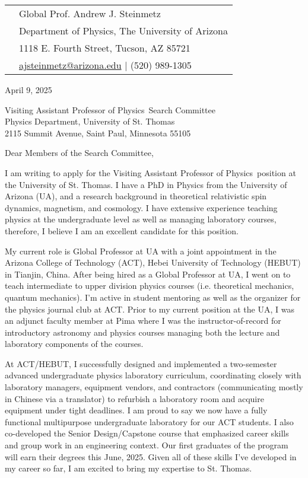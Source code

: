 \documentclass[11pt]{article}
\newcommand*{\PositionName}{Visiting Assistant Professor of Physics}
\newcommand*{\DepartmentName}{Physics Department}
\newcommand*{\FullName}{University of St. Thomas}
\newcommand*{\ShortName}{St. Thomas}
\newcommand*{\StreetAddress}{2115 Summit Avenue}
\newcommand*{\CityState}{Saint Paul, Minnesota 55105}
\begin{document}

\noindent
\begin{tabular}{@{}p{7.0cm} p{9.0cm}@{}}
    & Global Prof. Andrew J. Steinmetz\\
    & Department of Physics, The University of Arizona\\
    & 1118 E. Fourth Street, Tucson, AZ 85721\\
    & \href{mailto:ajsteinmetz@arizona.edu}{ajsteinmetz@arizona.edu} \(\vert\) (520) 989-1305
\end{tabular}

\vspace{1em}

\noindent
April 9, 2025

\vspace{1em}

\noindent
\PositionName\ Search Committee\\
\DepartmentName, \FullName\\
\StreetAddress, \CityState

\vspace{2em}


\noindent
Dear Members of the Search Committee,

\noindent
I am writing to apply for the \PositionName\ position at the \FullName. I have a PhD in Physics from the University of Arizona (UA), and a research background in theoretical relativistic spin dynamics, magnetism, and cosmology. I have extensive experience teaching physics at the undergraduate level as well as managing laboratory courses, therefore, I believe I am an excellent candidate for this position.

\indent My current role is Global Professor at UA with a joint appointment in the Arizona College of Technology (ACT), Hebei University of Technology (HEBUT) in Tianjin, China. After being hired as a Global Professor at UA, I went on to teach intermediate to upper division physics courses (i.e. theoretical mechanics, quantum mechanics). I'm active in student mentoring as well as the organizer for the physics journal club at ACT. Prior to my current position at the UA, I was an adjunct faculty member at Pima where I was the instructor-of-record for introductory astronomy and physics courses managing both the lecture and laboratory components of the courses.

At ACT/HEBUT, I successfully designed and implemented a two-semester advanced undergraduate physics laboratory curriculum, coordinating closely with laboratory managers, equipment vendors, and contractors (communicating mostly in Chinese via a translator) to refurbish a laboratory room and acquire equipment under tight deadlines. I am proud to say we now have a fully functional multipurpose undergraduate laboratory for our ACT students. I also co-developed the Senior Design/Capstone course that emphasized career skills and group work in an engineering context. Our first graduates of the program will earn their degrees this June, 2025. Given all of these skills I've developed in my career so far, I am excited to bring my expertise to \ShortName.
\end{document}
